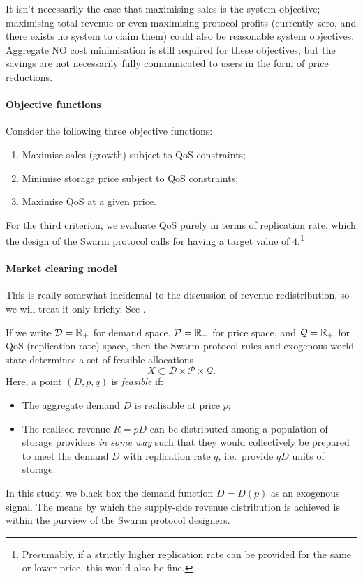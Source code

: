 It isn't necessarily the case that maximising sales is the system objective; maximising total revenue or even maximising protocol profits (currently zero, and there exists no system to claim them) could also be reasonable system objectives.
%
Aggregate NO cost minimisation is still required for these objectives, but the savings are not necessarily fully communicated to users in the form of price reductions.


\paragraph{Objective functions}
%
Consider the following three objective functions:
\begin{enumerate}
  \item Maximise sales (growth) subject to QoS constraints;
  \item Minimise storage price subject to QoS constraints;
  \item Maximise QoS at a given price.
\end{enumerate}
For the third criterion, we evaluate QoS purely in terms of replication rate, which the design of the Swarm protocol calls for having a target value of $4$.\footnote{Presumably, if a strictly higher replication rate can be provided for the same or lower price, this would also be fine.}

\paragraph{Market clearing model} This is really somewhat incidental to the discussion of revenue redistribution, so we will treat it only briefly. See \cite[\S10]{MT}.

If we write $\mathcal{D}=\mathbb{R}_+$ for demand space, $\mathcal{P}=\mathbb{R}_+$ for price space, and $\mathcal{Q}=\mathbb{R}_+$ for QoS (replication rate) space, then the Swarm protocol rules and exogenous world state determines a set of feasible allocations
%
\[
  X \subset \mathcal{D}\times\mathcal{P}\times\mathcal{Q}.
\]
%
Here, a point $(D,p,q)$ is \emph{feasible} if:
\begin{itemize}
  \item The aggregate demand $D$ is realisable at price $p$;
  \item The realised revenue $R=pD$ can be distributed among a population of storage providers \emph{in some way} such that they would collectively be prepared to meet the demand $D$ with replication rate $q$, i.e.~provide $qD$ units of storage.
\end{itemize}
%
In this study, we black box the demand function $D=D(p)$ as an exogenous signal.
%
The means by which the supply-side revenue distribution is achieved is within the purview of the Swarm protocol designers.

